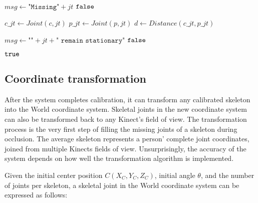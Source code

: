\begin{algorithm}[ht,width=0.9\columnwidth]
    \caption{$\Function{RemainStationary}(jt, c, p, msg)$}
    \\
    \label{algo:prm}
    \begin{algorithmic}[1]
        \setcounter{ALC@line}{0}
        \vspace*{1mm}

          \STATE $msg \leftarrow \texttt{"Missing"} + jt$
          \RETURN $\False$
        \ENDIF

        \STATE $c\_jt \leftarrow Joint(c, jt)$
        \STATE $p\_jt \leftarrow Joint(p, jt)$
        \STATE $d \leftarrow Distance(c\_jt, p\_jt)$

          \STATE $msg \leftarrow \texttt{""} + jt + \texttt{" remain stationary"}$
          \RETURN $\False$
        \ENDIF

        \RETURN $\True$
    \end{algorithmic}
\end{algorithm}


\subsection{Coordinate transformation}

After the system completes calibration, it can transform any calibrated skeleton into the World coordinate system. Skeletal joints in the new coordinate system can also be transformed back to any Kinect's field of view. The transformation process is the very first step of filling the missing joints of a skeleton during occlusion. The average skeleton represents a person' complete joint coordinates, joined from multiple Kinects fields of view. Unsurprisingly, the accuracy of the system depends on how well the transformation algorithm is implemented.

Given the initial center position $C(X_C, Y_C, Z_C)$, initial angle $\theta$, and the number of joints per skeleton, a skeletal joint in the World coordinate system can be expressed as follows:

